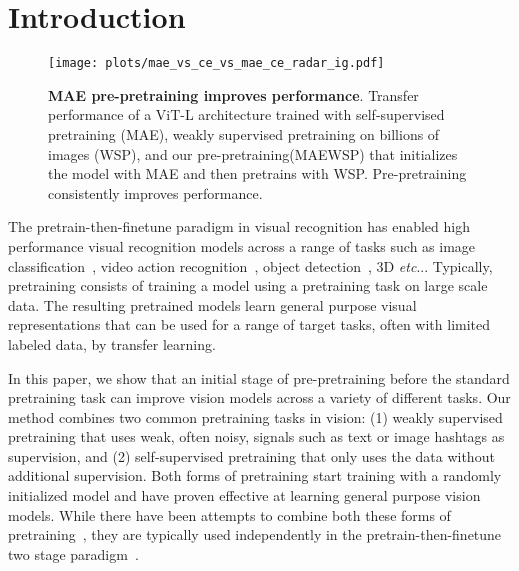 \documentclass[10pt,twocolumn,letterpaper]{article}
\makeatletter
\DeclareRobustCommand\onedot{\futurelet\@let@token\@onedot}
\def\@onedot{\ifx\@let@token.\else.\null\fi\xspace}
\def\etc{\emph{etc}\onedot} \def\vs{\emph{vs}\onedot}
\newif\ifarxiv
\newcommand{\prept}{pre-pretraining\xspace}
\newcommand{\Prept}{Pre-pretraining\xspace}
\newcommand{\mae}{MAE\xspace}
\newcommand{\ce}{WSP\xspace}
\newcommand{\ours}{MAEWSP\xspace}  \newcommand{\oursig}{\ours{}\textsubscript{IG}\xspace}
\newcommand{\vitL}{ViT-L\xspace}
\makeatother
\begin{document}
 \section{Introduction}
\label{sec:intro}



\begin{figure}
  \centering
  \texttt{[image: plots/mae\_vs\_ce\_vs\_mae\_ce\_radar\_ig.pdf]}
    \ifarxiv
        \vspace{-0.2in}
    \else
        \vspace{-0.2in}
    \fi
  \caption{\textbf{\mae \prept improves performance}.
  Transfer performance of a \vitL architecture trained with self-supervised  pretraining (\mae), weakly supervised pretraining on billions of images (\ce), and our \prept (\ours) that initializes the model with \mae and then pretrains with \ce.
  \Prept consistently improves performance.
  }
  \label{fig:mae_vs_ce_vs_mae_ce_ig}
\end{figure}
 
The pretrain-then-finetune paradigm in visual recognition has enabled high performance visual recognition models across a range of tasks such as image classification~\cite{singh2022revisiting,mahajan2018exploring,radford2021learning}, video action recognition~\cite{girdhar2023omnimae,feichtenhofer2022masked,ghadiyaram2019large}, object detection~\cite{caron2020unsupervised,zhou2021ibot}, 3D \etc.
Typically, pretraining consists of training a model using a pretraining task on large scale data.
The resulting pretrained models learn general purpose visual representations that can be used for a range of target tasks, often with limited labeled data, by transfer learning.

In this paper, we show that an initial stage of \prept before the standard pretraining task can improve vision models across a variety of different tasks.
Our method combines two common pretraining tasks in vision: (1) weakly supervised pretraining that uses weak, often noisy, signals such as text or image hashtags as supervision, and (2) self-supervised pretraining that only uses the data without additional supervision.
Both forms of pretraining start training with a randomly initialized model and have proven effective at learning general purpose vision models.
While there have been attempts to combine both these forms of pretraining~\cite{mu2022slip, singh2022flava}, they are typically used independently in the pretrain-then-finetune two stage paradigm~\cite{dosovitskiy2020image, zhai2022scaling,singh2022revisiting}.
\end{document}
